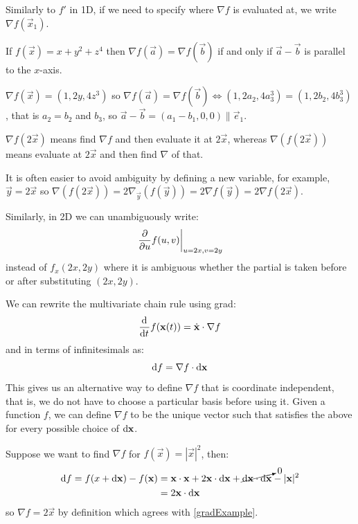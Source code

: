 \documentclass[../main.tex]{subfiles}
\begin{document}
Similarly to $f'$ in 1D, if we need to specify where $\nabla f$ is evaluated at, we write $\nabla f(\vec{x}_1)$.
\begin{example}
  If $f(\vec{x}) = x + y^2 + z^{4}$ then $\nabla f(\vec{a}) = \nabla f(\vec{b})$ if and only if $\vec{a} - \vec{b}$ is parallel to the $x$-axis.

  $\nabla f(\vec{x}) = (1, 2y, 4z^3)$ so $\nabla f(\vec{a}) = \nabla f(\vec{b}) \iff (1, 2a_2, 4a^{3}_{3}) = (1, 2b_2, 4b^{3}_{3})$, that is $a_2 = b_2$ and $b_3$, so $\vec{a} - \vec{b} = (a_1 - b_1, 0, 0) \parallel \vec{e}_1$.
\end{example}
\begin{remark}[Notation]
  $\nabla f(2\vec{x})$ means find $\nabla f$ and then evaluate it at $2\vec{x}$, whereas $\nabla (f(2\vec{x}))$ means evaluate at $2\vec{x}$ and then find $\nabla$ of that.

  It is often easier to avoid ambiguity by defining a new variable, for example, $\vec{y} = 2\vec{x}$ so $\nabla (f(2\vec{x})) = 2 \nabla_{\vec{y}} (f(\vec{y})) = 2 \nabla f(\vec{y}) = 2 \nabla f(2\vec{x})$.

  Similarly, in 2D we can unambiguously write:
  \[
    \at{\pderiv{}{u} f(u, v)}{u = 2x, v = 2y}
  \]
  instead of $f_x(2x, 2y)$ where it is ambiguous whether the partial is taken before or after substituting $(2x, 2y)$.
\end{remark}
We can rewrite the multivariate chain rule using grad:
\begin{equation}
  \deriv{}{t}f(\vec{x}(t)) = \dot{\vec{x}} \cdot \nabla f \label{MVCGrad}
\end{equation}
and in terms of infinitesimals as:
\begin{equation}
  \d{f} = \nabla f \cdot \d{\vec{x}} \label{infinitesimalsGrad}
\end{equation}
This gives us an alternative way to define $\nabla f$ that is coordinate independent, that is, we do not have to choose a particular basis before using it.
Given a function $f$, we can define $\nabla f$ to be the unique vector such that satisfies the above for every possible choice of $\d{\vec{x}}$.
\begin{example}
  Suppose we want to find $\nabla f$ for $f(\vec{x}) = |\vec{x}|^2$, then:
  \begin{align*}
    \d{f} = f(x + \d{\vec{x}}) - f(\vec{x}) &= \vec{x} \cdot \vec{x} + 2\vec{x} \cdot \d{\vec{x}} + \cancelto{0}{\d{\vec{x}} \cdot \d{\vec{x}}} - |\vec{x}|^2 \\
                                            &= 2\vec{x} \cdot \d{\vec{x}}
  \end{align*}
  so $\nabla f = 2\vec{x}$ by definition which agrees with \cref{gradExample}.
\end{example}
\end{document}
